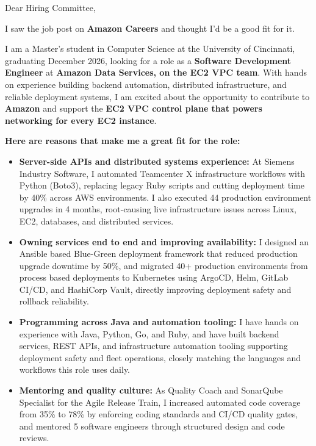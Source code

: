 \documentclass[11pt]{letter}
\date{}
\begin{document}
\begin{letter}{}

\opening{Dear Hiring Committee,}

I saw the job post on \textbf{Amazon Careers} and thought I'd be a good fit for it.

I am a Master's student in Computer Science at the University of Cincinnati, graduating December 2026, looking for a role as a \textbf{Software Development Engineer} at \textbf{Amazon Data Services, on the EC2 VPC team}. With hands on experience building backend automation, distributed infrastructure, and reliable deployment systems, I am excited about the opportunity to contribute to \textbf{Amazon} and support the \textbf{EC2 VPC control plane that powers networking for every EC2 instance}.

\textbf{Here are reasons that make me a great fit for the role:}

\begin{itemize}[leftmargin=*, itemsep=0.45em]
    \item \textbf{Server-side APIs and distributed systems experience:} At Siemens Industry Software, I automated Teamcenter X infrastructure workflows with Python (Boto3), replacing legacy Ruby scripts and cutting deployment time by 40\% across AWS environments. I also executed 44 production environment upgrades in 4 months, root-causing live infrastructure issues across Linux, EC2, databases, and distributed services.

    \item \textbf{Owning services end to end and improving availability:} I designed an Ansible based Blue-Green deployment framework that reduced production upgrade downtime by 50\%, and migrated 40+ production environments from process based deployments to Kubernetes using ArgoCD, Helm, GitLab CI/CD, and HashiCorp Vault, directly improving deployment safety and rollback reliability.

    \item \textbf{Programming across Java and automation tooling:} I have hands on experience with Java, Python, Go, and Ruby, and have built backend services, REST APIs, and infrastructure automation tooling supporting deployment safety and fleet operations, closely matching the languages and workflows this role uses daily.

    \item \textbf{Mentoring and quality culture:} As Quality Coach and SonarQube Specialist for the Agile Release Train, I increased automated code coverage from 35\% to 78\% by enforcing coding standards and CI/CD quality gates, and mentored 5 software engineers through structured design and code reviews.
\end{itemize}


\end{letter}
\end{document}
